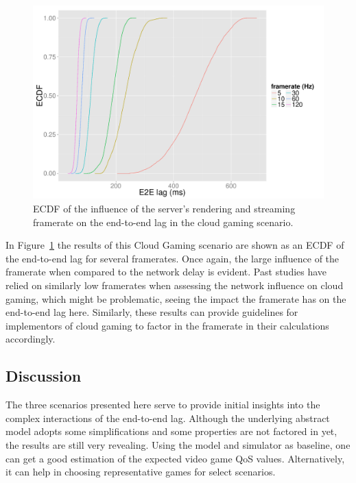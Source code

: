 \begin{figure}[!t]
	\centering
	\includegraphics[width=1.0\columnwidth]{../simulation/visualization/cloudgaming-lag-cdf.pdf}
	\caption{\acrshort{ECDF} of the influence of the server's rendering and streaming framerate on the end-to-end lag in the cloud gaming scenario.}
\label{fig:cloud-e2e-delay-sim}
\end{figure}

In Figure~\ref{fig:cloud-e2e-delay-sim} the results of this Cloud Gaming scenario are shown as an \gls{ECDF} of the end-to-end lag for several framerates. Once again, the large influence of the framerate when compared to the network delay is evident. Past studies have relied on similarly low framerates when assessing the network influence on cloud gaming, which might be problematic, seeing the impact the framerate has on the end-to-end lag here. 
Similarly, these results can provide guidelines for implementors of cloud gaming to factor in the framerate in their calculations accordingly.


\subsection{Discussion}

The three scenarios presented here serve to provide initial insights into the complex interactions of the end-to-end lag. Although the underlying abstract model adopts some simplifications and some properties are not factored in yet, the results are still very revealing.
Using the model and simulator as baseline, one can get a good estimation of the expected video game \gls{QoS} values. Alternatively, it can help in choosing representative games for select scenarios.

